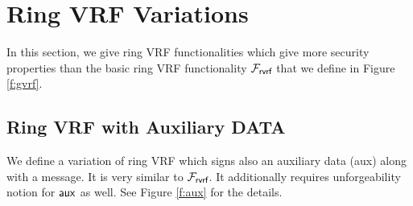 \section{Ring VRF Variations}
\label{sec:morefuncs}
In this section, we give ring VRF functionalities which give more security properties than the basic ring VRF functionality $ \mathcal{F}_{\textsf{rvrf}} $ that we define in Figure \ref{f:gvrf}.

\newcommand{\faux}{\fgvrf^{\mathsf{aux}}}
\subsection{Ring VRF with Auxiliary DATA}
We define a variation of ring VRF which signs also an auxiliary data (aux) along with a message. It is very similar to $ \mathcal{F}_{\textsf{rvrf}} $. It additionally requires unforgeability notion for $ \mathsf{aux} $ as well. See Figure \ref{f:aux} for the details.
